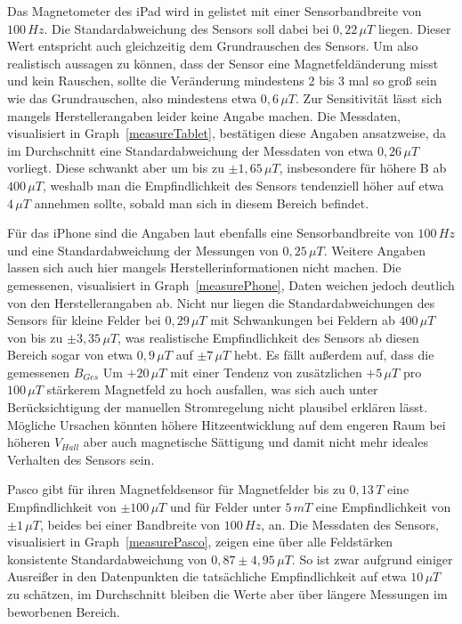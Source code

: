 \documentclass[12pt, a4paper]{article}
\begin{document}
Das Magnetometer des iPad wird in \cite{sensordb} gelistet mit einer Sensorbandbreite von $100\,Hz$. Die Standardabweichung des Sensors soll dabei bei $0,22\,\mu{T}$ liegen. Dieser Wert entspricht auch gleichzeitig dem Grundrauschen des Sensors. Um also realistisch aussagen zu können, dass der Sensor eine Magnetfeldänderung misst und kein Rauschen, sollte die Veränderung mindestens 2 bis 3 mal so groß sein wie das Grundrauschen, also mindestens etwa $0,6\,\mu{T}$. Zur Sensitivität lässt sich mangels Herstellerangaben leider keine Angabe machen.\newline
Die Messdaten, visualisiert in Graph~\ref{measureTablet}, bestätigen diese Angaben ansatzweise, da im Durchschnitt eine Standardabweichung der Messdaten von etwa $0,26\,\mu{T}$ vorliegt. Diese schwankt aber um bis zu $\pm1,65\,\mu{T}$, insbesondere für höhere B ab $400\,\mu{T}$, weshalb man die Empfindlichkeit des Sensors tendenziell höher auf etwa $4\,\mu{T}$ annehmen sollte, sobald man sich in diesem Bereich befindet.
\newline

Für das iPhone sind die Angaben laut \cite{sensordb} ebenfalls eine Sensorbandbreite von $100\,Hz$ und eine Standardabweichung der Messungen von $0,25\,\mu{T}$. Weitere Angaben lassen sich auch hier mangels Herstellerinformationen nicht machen.\newline
Die gemessenen, visualisiert in Graph~\ref{measurePhone}, Daten weichen jedoch deutlich von den Herstellerangaben ab. Nicht nur liegen die Standardabweichungen des Sensors für kleine Felder bei $0,29\,\mu{T}$ mit Schwankungen bei Feldern ab $400\,\mu{T}$ von bis zu $\pm3,35\,\mu{T}$, was realistische Empfindlichkeit des Sensors ab diesen Bereich sogar von etwa $0,9\,\mu{T}$ auf $\pm7\,\mu{T}$ hebt. Es fällt außerdem auf, dass die gemessenen $B_{Ges}$ Um $+20\,\mu{T}$ mit einer Tendenz von zusätzlichen $+5\,\mu{T}$ pro $100\,\mu{T}$ stärkerem Magnetfeld zu hoch ausfallen, was sich auch unter Berücksichtigung der manuellen Stromregelung nicht plausibel erklären lässt. Mögliche Ursachen könnten höhere Hitzeentwicklung auf dem engeren Raum bei höheren $V_{Hall}$ aber auch magnetische Sättigung und damit nicht mehr ideales Verhalten des Sensors sein.
\newline

Pasco gibt für ihren Magnetfeldsensor für Magnetfelder bis zu $0,13\,T$ eine Empfindlichkeit von $\pm100\,\mu{T}$ und für Felder unter $5\,mT$ eine Empfindlichkeit von $\pm1\,\mu{T}$, beides bei einer Bandbreite von $100\,Hz$, an.\newline
Die Messdaten des Sensors, visualisiert in Graph~\ref{measurePasco}, zeigen eine über alle Feldstärken konsistente Standardabweichung von $0,87\pm4,95\,\mu{T}$. So ist zwar aufgrund einiger Ausreißer in den Datenpunkten die tatsächliche Empfindlichkeit auf etwa $10\,\mu{T}$ zu schätzen, im Durchschnitt bleiben die Werte aber über längere Messungen im beworbenen Bereich.\newline
\end{document}
